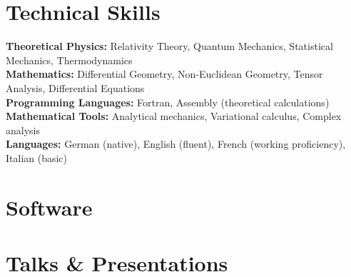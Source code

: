 \documentclass[letterpaper,11pt]{article}
\begin{document}

\ifcv
\section*{Technical Skills}

\textbf{Theoretical Physics:} Relativity Theory, Quantum Mechanics, Statistical Mechanics, Thermodynamics \\
\textbf{Mathematics:} Differential Geometry, Non-Euclidean Geometry, Tensor Analysis, Differential Equations \\
\textbf{Programming Languages:} Fortran, Assembly (theoretical calculations) \\
\textbf{Mathematical Tools:} Analytical mechanics, Variational calculus, Complex analysis \\
\textbf{Languages:} German (native), English (fluent), French (working proficiency), Italian (basic)
\fi


\ifcv
\section*{Software}

\begin{itemize}
\end{itemize}
\fi


\ifcv
\section*{Talks \& Presentations}

\begin{itemize}
\end{itemize}
\fi
\end{document}
